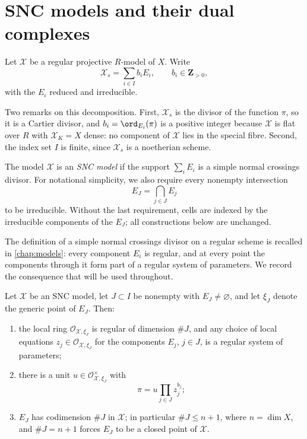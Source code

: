 \section{SNC models and their dual complexes}
\label{sec:skeleton-snc}

Let $\mathcal X$ be a regular projective $R$-model of $X$. Write
\[
                 \mathcal X_s=\sum_{i\in I}b_iE_i,
                 \qquad b_i\in\mathbf Z_{>0},
\]
with the $E_i$ reduced and irreducible.

Two remarks on this decomposition. First, $\mathcal X_s$ is the divisor of
the function $\pi$, so it is a Cartier divisor, and $b_i=\ord_{E_i}(\pi)$
is a positive integer because $\mathcal X$ is flat over $R$ with
$\mathcal X_K=X$ dense: no component of $\mathcal X$ lies in the special
fibre. Second, the index set $I$ is finite, since $\mathcal X_s$ is a
noetherian scheme.

\begin{definition}
\label{def:skeleton-snc-model}
The model $\mathcal X$ is an \emph{SNC model} if the support
$\sum_iE_i$ is a simple normal crossings divisor. For notational
simplicity, we also require every nonempty intersection
\[
                         E_J=\bigcap_{j\in J}E_j
\]
to be irreducible. Without the last requirement, cells are indexed by the
irreducible components of the $E_J$; all constructions below are
unchanged.
\end{definition}

The definition of a simple normal crossings divisor on a regular scheme is
recalled in \cref{chap:models}: every component $E_i$ is regular, and at
every point the components through it form part of a regular system of
parameters. We record the consequence that will be used throughout.

\begin{lemma}
\label{lem:snc-normal-form}
Let $\mathcal X$ be an SNC model, let $J\subset I$ be nonempty with
$E_J\neq\varnothing$, and let $\xi_J$ denote the generic point of
$E_J$. Then:
\begin{enumerate}
\item\label{itm:snc-nf:regular} the local ring
  $\mathcal O_{\mathcal X,\xi_J}$ is regular of dimension $\#J$, and any
  choice of local equations $z_j\in\mathcal O_{\mathcal X,\xi_J}$ for the
  components $E_j$, $j\in J$, is a regular system of parameters;
\item\label{itm:snc-nf:pi} there is a unit
  $u\in\mathcal O_{\mathcal X,\xi_J}^\times$ with
  \[
                         \pi=u\prod_{j\in J}z_j^{b_j};
  \]
\item\label{itm:snc-nf:strata} $E_J$ has codimension $\#J$ in
  $\mathcal X$; in particular $\#J\le n+1$, where $n=\dim X$, and
  $\#J=n+1$ forces $E_J$ to be a closed point of $\mathcal X$.
\end{enumerate}
\end{lemma}

